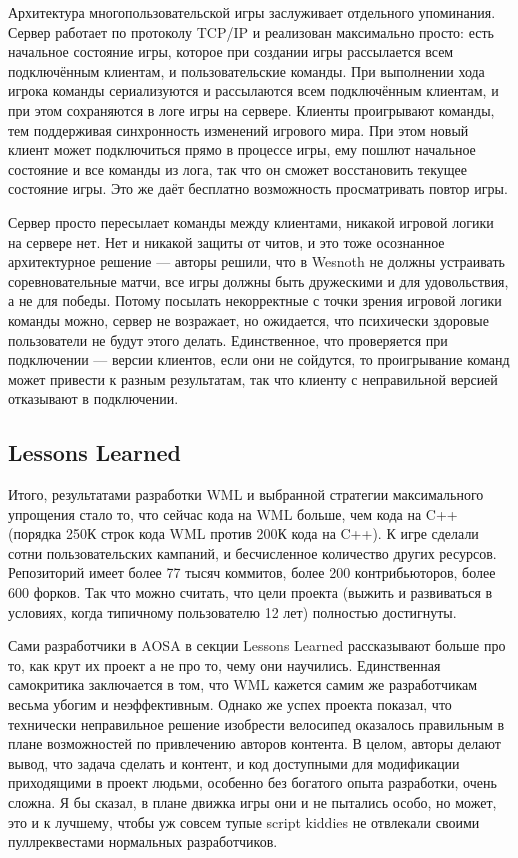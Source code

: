 \documentclass{../text-style}
\begin{document}
Архитектура многопользовательской игры заслуживает отдельного упоминания. Сервер работает по протоколу TCP/IP и реализован максимально просто: есть начальное состояние игры, которое при создании игры рассылается всем подключённым клиентам, и пользовательские команды. При выполнении хода игрока команды сериализуются и рассылаются всем подключённым клиентам, и при этом сохраняются в логе игры на сервере. Клиенты проигрывают команды, тем поддерживая синхронность изменений игрового мира. При этом новый клиент может подключиться прямо в процессе игры, ему пошлют начальное состояние и все команды из лога, так что он сможет восстановить текущее состояние игры. Это же даёт бесплатно возможность просматривать повтор игры.

Сервер просто пересылает команды между клиентами, никакой игровой логики на сервере нет. Нет и никакой защиты от читов, и это тоже осознанное архитектурное решение --- авторы решили, что в Wesnoth не должны устраивать соревновательные матчи, все игры должны быть дружескими и для удовольствия, а не для победы. Потому посылать некорректные с точки зрения игровой логики команды можно, сервер не возражает, но ожидается, что психически здоровые пользователи не будут этого делать. Единственное, что проверяется при подключении --- версии клиентов, если они не сойдутся, то проигрывание команд может привести к разным результатам, так что клиенту с неправильной версией отказывают в подключении.

\subsection{Lessons Learned}

Итого, результатами разработки WML и выбранной стратегии максимального упрощения стало то, что сейчас кода на WML больше, чем кода на C++ (порядка 250К строк кода WML против 200К кода на C++). К игре сделали сотни пользовательских кампаний, и бесчисленное количество других ресурсов. Репозиторий имеет более 77 тысяч коммитов, более 200 контрибьюторов, более 600 форков. Так что можно считать, что цели проекта (выжить и развиваться в условиях, когда типичному пользователю 12 лет) полностью достигнуты. 

Сами разработчики в AOSA в секции Lessons Learned рассказывают больше про то, как крут их проект а не про то, чему они научились. Единственная самокритика заключается в том, что WML кажется самим же разработчикам весьма убогим и неэффективным. Однако же успех проекта показал, что технически неправильное решение изобрести велосипед оказалось правильным в плане возможностей по привлечению авторов контента. В целом, авторы делают вывод, что задача сделать и контент, и код доступными для модификации приходящими в проект людьми, особенно без богатого опыта разработки, очень сложна. Я бы сказал, в плане движка игры они и не пытались особо, но может, это и к лучшему, чтобы уж совсем тупые script kiddies не отвлекали своими пуллреквестами нормальных разработчиков.
\end{document}

